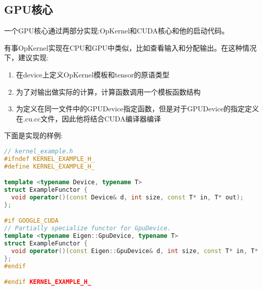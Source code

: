 \subsection{GPU核心}
一个GPU核心通过两部分实现:OpKernel和CUDA核心和他的启动代码。

有事OpKernel实现在CPU和GPU中类似，比如查看输入和分配输出。在这种情况下，建议实现:
\begin{enumerate}
\item 在device上定义OpKernel模板和tensor的原语类型
\item 为了对输出做实际的计算，计算函数调用一个模板函数结构
\item 为定义在同一文件中的GPUDevice指定函数，但是对于GPUDevice的指定定义在.cu.cc文件，因此他将结合CUDA编译器编译
\end{enumerate}
下面是实现的样例:
\begin{lstlisting}[language=C++]
// kernel_example.h
#ifndef KERNEL_EXAMPLE_H_
#define KERNEL_EXAMPLE_H_

template <typename Device, typename T>
struct ExampleFunctor {
  void operator()(const Device& d, int size, const T* in, T* out);
};

#if GOOGLE_CUDA
// Partially specialize functor for GpuDevice.
template <typename Eigen::GpuDevice, typename T>
struct ExampleFunctor {
  void operator()(const Eigen::GpuDevice& d, int size, const T* in, T* out);
};
#endif

#endif KERNEL_EXAMPLE_H_
\end{lstlisting}

